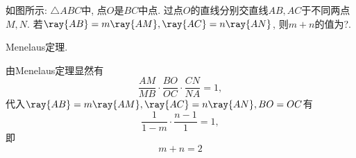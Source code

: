 \documentclass[8pt]{article}
\begin{document}
		\begin{easonproblem}
			如图所示: \(\triangle{ABC}\)中, 点\(O\)是\(BC\)中点. 过点\(O\)的直线分别交直线\(AB, AC\)于不同两点\(M, N\). 若\(\ray{AB} = m\ray{AM}, \ray{AC} = n\ray{AN}\), 则\(m+n\)的值为?.
			\begin{center}
			\end{center}
			\subproblem
			 Menelaus定理.

			由Menelaus定理显然有
			\begin{displaymath}
				\frac{AM}{MB} \cdot \frac{BO}{OC} \cdot \frac{CN}{NA} = 1,
			\end{displaymath}
			代入\(\ray{AB} = m\ray{AM}, \ray{AC} = n\ray{AN}, BO = OC\)有
			\begin{displaymath}
				\frac{1}{1 - m} \cdot \frac{n - 1}{1} = 1,
			\end{displaymath}
			即
			\begin{displaymath}
				m + n = 2
			\end{displaymath}
		\end{easonproblem}
\end{document}
